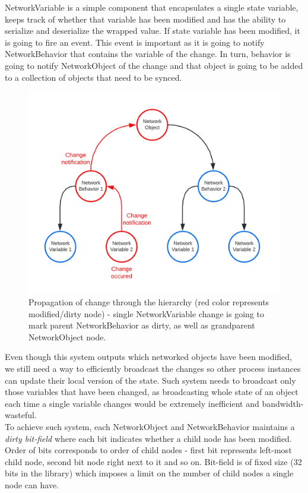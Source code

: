 \documentclass[times, utf8, diplomski]{fer}
\begin{document}
NetworkVariable is a simple component that encapsulates a single state variable, keeps track of whether that variable has been modified and has the ability to serialize and deserialize the wrapped value. If state variable has been modified, it is going to fire an event. This event is important as it is going to notify NetworkBehavior that contains the variable of the change. In turn, behavior is going to notify NetworkObject of the change and that object is going to be added to a collection of objects that need to be synced.

\begin{figure}[H]
	\centering
	\includegraphics[scale=0.3]{NetworkObject-propagation-of-change}
	\caption{Propagation of change through the hierarchy (red color represents modified/dirty node) - single NetworkVariable change is going to mark parent NetworkBehavior as dirty, as well as grandparent NetworkObject node.}
\end{figure}

Even though this system outputs which networked objects have been modified, we still need a way to efficiently broadcast the changes so other process instances can update their local version of the state. Such system needs to broadcast only those variables that have been changed, as broadcasting whole state of an object each time a single variable changes would be extremely inefficient and bandwidth-wasteful.\\

To achieve such system, each NetworkObject and NetworkBehavior maintains a \textit{dirty bit-field} where each bit indicates whether a child node has been modified. Order of bits corresponds to order of child nodes - first bit represents left-most child node, second bit node right next to it and so on. Bit-field is of fixed size (32 bits in the library) which imposes a limit on the number of child nodes a single node can have.
\end{document}

